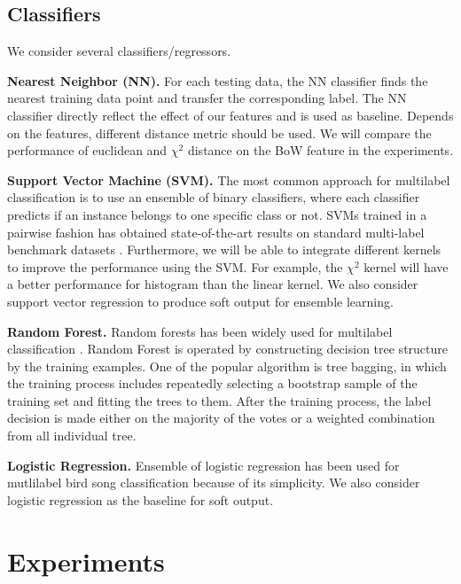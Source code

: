 \documentclass{article} %
\begin{document}
\subsection{Classifiers}
We consider several classifiers/regressors.

\textbf{Nearest Neighbor (NN).} For each testing data, the NN classifier finds the nearest training data point and transfer the corresponding label. The NN classifier directly reflect the effect of our features and is used as baseline. Depends on the features, different distance metric should be used. We will compare the performance of euclidean and $\chi^2$ distance on the BoW feature in the experiments.

\textbf{Support Vector Machine (SVM).} The most common approach for multilabel classification is to use an ensemble of binary classifiers, where each classifier predicts if an instance belongs to
one specific class or not. SVMs trained in a pairwise fashion has obtained state-of-the-art results on standard multi-label benchmark datasets \cite{Mencia_NIPSW13}. Furthermore, we will be able to integrate different kernels to improve the performance using the SVM. For example, the $\chi^2$ kernel will have a better performance for histogram than the linear kernel. We also consider support vector regression to produce soft output for ensemble learning.


\textbf{Random Forest.} Random forests has been widely used for multilabel classification \cite{Lasseck13, chennovel13, Stowell_NIPSW13, Zhang_SDM2010}.
Random Forest is operated by constructing decision tree structure by the training examples. One of the popular algorithm is tree bagging, in which the training process includes repeatedly selecting a bootstrap sample of the training set and  fitting the trees to them. After the training process, the label decision is made either on the majority of the votes or a weighted combination from all individual tree.


\textbf{Logistic Regression.} Ensemble of logistic regression has been used for mutlilabel bird song classification \cite{Massaron13} because of its simplicity. We also consider logistic regression as the baseline for soft output.



\section{Experiments}
\end{document}
